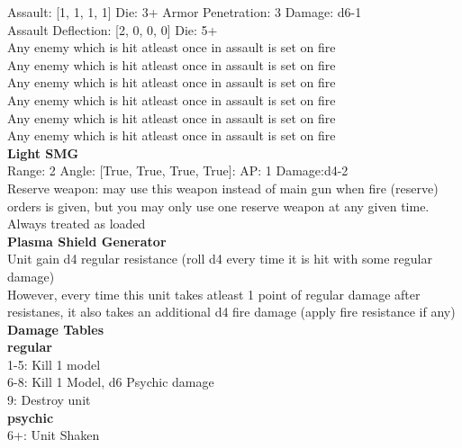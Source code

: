 Assault: [1, 1, 1, 1] Die: 3+ Armor Penetration: 3 Damage: d6-1 \\
Assault Deflection: [2, 0, 0, 0] Die: 5+\\
\indent Any enemy which is hit atleast once in assault is set on fire\\ 
Any enemy which is hit atleast once in assault is set on fire\\ 
Any enemy which is hit atleast once in assault is set on fire\\ 
Any enemy which is hit atleast once in assault is set on fire\\ 
Any enemy which is hit atleast once in assault is set on fire\\ 
Any enemy which is hit atleast once in assault is set on fire\\ 
 



{\bf Light SMG } \\



Range: 2  Angle: [True, True, True, True]: AP: 1 Damage:d4-2 \\
Reserve weapon: may use this weapon instead of main gun when fire (reserve) orders is given, but you may only use one reserve weapon at any given time.\\ 
Always treated as loaded\\ 




{\bf Plasma Shield Generator } \\

Unit gain d4 regular resistance (roll d4 every time it is hit with some regular damage)\\ 
However, every time this unit takes atleast 1 point of regular damage after resistanes, it also takes an additional d4 fire damage (apply fire resistance if any)\\ 





 





{\bf Damage Tables} \\
 {\bf regular } \\
1-5: Kill 1 model \\
6-8: Kill 1 Model, d6 Psychic damage \\
9: Destroy unit \\
 {\bf psychic } \\
6+: Unit Shaken \\










